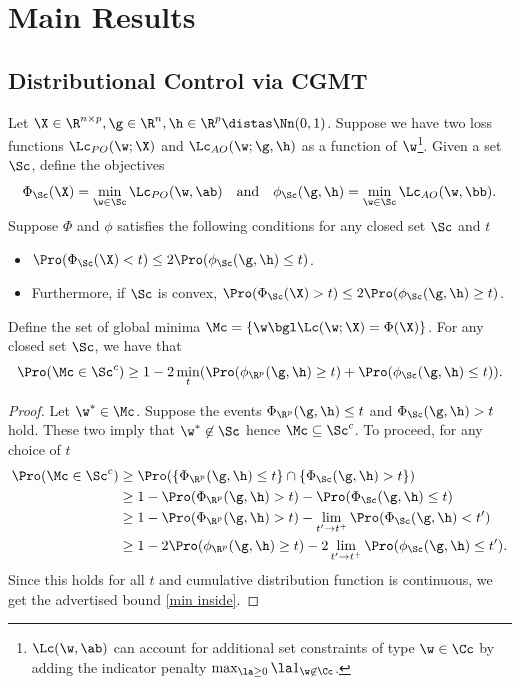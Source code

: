 \section{Main Results}\label{doubdec}




\subsection{Distributional Control via CGMT}
\begin{lemma}  \label{dist cont lem}Let $\X\in\R^{n\times p},\g\in\R^n,\h\in\R^p\distas\Nn(0,1)$. Suppose we have two loss functions $\Lc_{PO}(\w;\X)$ and $\Lc_{AO}(\w;\g,\h)$ as a function of $\w$\footnote{$\Lc(\w,\ab)$ can account for additional set constraints of type $\w\in\Cc$ by adding the indicator penalty $\max_{\la\geq 0}\la 1_{\w\not\in\Cc}$.}. Given a set $\Sc$, define the objectives 
\[
\Phi_{\Sc}(\X)=\min_{\w\in\Sc}\Lc_{PO}(\w,\ab)\quad\text{and}\quad\phi_{\Sc}(\g,\h)=\min_{\w\in\Sc}\Lc_{AO}(\w,\bb).
\]
Suppose $\Phi$ and $\phi$ satisfies the following conditions for any closed set $\Sc$ and $t$
\begin{itemize}
\item $\Pro(\Phi_{\Sc}(\X) < t)\leq2\Pro(\phi_{\Sc}(\g,\h)\leq t)$.
\item Furthermore, if $\Sc$ is convex, $\Pro(\Phi_{\Sc}(\X) > t)\leq2\Pro(\phi_{\Sc}(\g,\h)\geq t)$.%
\end{itemize}
Define the set of global minima $\Mc=\{\w\bgl \Lc(\w;\X)=\Phi(\X)\}$. For any closed set $\Sc$, we have that
\begin{align}
\Pro(\Mc\in\Sc^c)\geq 1-2\min_{t}(\Pro(\phi_{\R^p}(\g,\h)\geq t)+\Pro(\phi_{\Sc}(\g,\h)\leq t)).\label{min inside}
\end{align}
\end{lemma}
\begin{proof} Let $\w^*\in\Mc$. Suppose the events $\Phi_{\R^p}(\g,\h)\leq t$ and $\Phi_{\Sc}(\g,\h)> t$ hold. These two imply that $\w^*\not\in\Sc$ hence $\Mc\subseteq\Sc^c$. To proceed, for any choice of $t$
\begin{align}
\Pro(\Mc\in\Sc^c)&\geq \Pro(\{\Phi_{\R^p}(\g,\h)\leq t\}\cap \{\Phi_{\Sc}(\g,\h)> t\})\\
&\geq 1-\Pro(\Phi_{\R^p}(\g,\h)> t)-\Pro(\Phi_{\Sc}(\g,\h)\leq t)\\
&\geq 1-\Pro(\Phi_{\R^p}(\g,\h)> t)-\lim_{t'\rightarrow t^+}\Pro(\Phi_{\Sc}(\g,\h)<t')\\
&\geq 1-2\Pro(\phi_{\R^p}(\g,\h)\geq t)-2\lim_{t'\rightarrow t^+}\Pro(\phi_{\Sc}(\g,\h)\leq t').
\end{align}
Since this holds for all $t$ and cumulative distribution function is continuous, we get the advertised bound \eqref{min inside}.
\end{proof}








\newpage